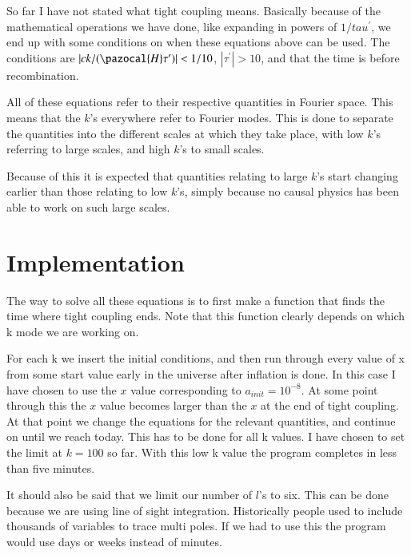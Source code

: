 \documentclass[a4paper]{report}
\begin{document}
So far I have not stated what tight coupling means. Basically because of the mathematical operations we have done, like expanding in powers of $1/tau^\prime$, we end up with some conditions on when these equations above can be used. The conditions are $|ck/(\pazocal{H}\tau^\prime)| < 1/10$, $|\tau^\prime|>10$, and that the time is before recombination.
 
All of these equations refer to their respective quantities in Fourier space. This means that the $k$'s everywhere refer to Fourier modes. This is done to separate the quantities into the different scales at which they take place, with low $k$'s referring to large scales, and high $k$'s to small scales.

Because of this it is expected that quantities relating to large $k$'s start changing earlier than those relating to low $k$'s, simply because no causal physics has been able to work on such large scales.
 
\section{Implementation}\label{sec:Imp}
The way to solve all these equations is to first make a function that finds the time where tight coupling ends.
Note that this function clearly depends on which k mode we are working on.

For each k we insert the initial conditions, and then run through every value of x from some start value early in the universe after inflation is done. In this case I have chosen to use the $x$ value corresponding to $a_{init} = 10^{-8}$.
At some point through this the $x$ value becomes larger than the $x$ at the end of tight coupling. At that point we change the equations for the relevant quantities, and continue on until we reach today.
This has to be done for all k values. I have chosen to set the limit at $k=100$ so far. With this low k value the program completes in less than five minutes.

It should also be said that we limit our number of $l$'s to six. This can be done because we are using line of sight integration. Historically people used to include thousands of variables to trace multi poles. If we had to use this the program would use days or weeks instead of minutes.

\end{document}
